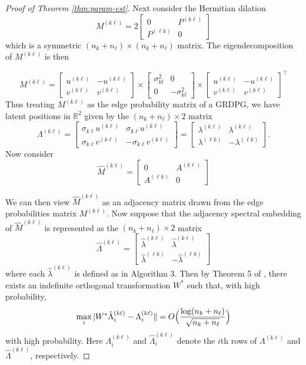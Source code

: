 \documentclass[
  12pt,
]{article}
\theoremstyle{definition}
\theoremstyle{definition}
\theoremstyle{definition}
\theoremstyle{definition}
\theoremstyle{remark}
\begin{document}
\begin{proof}[Proof of Theorem \ref{thm:param-est}]
Next consider the Hermitian dilation
\[
M^{(k \ell)} = 2 \begin{bmatrix} 0 & P^{(k \ell)} \\ P^{(\ell k)} & 0 \end{bmatrix}
\]
which is a symmetric \((n_k + n_\ell) \times (n_k + n_\ell)\) matrix. 
The eigendecomposition of \(M^{(k \ell)}\) is then

\[M^{(k \ell)} = 
\begin{bmatrix} u^{(k \ell)} & -u^{(k \ell)} \\ v^{(k \ell)} & v^{(k \ell)} \end{bmatrix} \times 
\begin{bmatrix} \sigma^2_{kl} & 0 \\ 0 & -\sigma^2_{kl} \end{bmatrix} \times
\begin{bmatrix} u^{(k \ell)} & -u^{(k \ell)} \\ v^{(k \ell)} & v^{(k \ell)} \end{bmatrix}^\top\]
Thus treating \(M^{(k \ell)}\) as the edge probability matrix of a GRDPG, we have latent positions in \(\mathbb{R}^2\) given by the $(n_k + n_{\ell}) \times 2$ matrix
\[\Lambda^{(k \ell)} = \begin{bmatrix} 
\sigma_{k \ell} u^{(k \ell)} & \sigma_{k \ell} u^{(k \ell)} \\ 
\sigma_{k \ell} v^{(k \ell)} & -\sigma_{k \ell} v^{(k \ell)} 
\end{bmatrix} = 
\begin{bmatrix} 
\lambda^{(k \ell)} & \lambda^{(k \ell)} \\ 
\lambda^{( \ell k)} & -\lambda^{( \ell k)} 
\end{bmatrix}.\]
Now consider
\[\hat{M}^{(k \ell)} = \begin{bmatrix} 0 & A^{(k \ell)} \\ A^{(\ell k)} & 0 \end{bmatrix}\]

We can then view \(\hat{M}^{(k \ell)}\) as an adjacency matrix drawn from
the edge probabilities matrix \(M^{(k \ell)}\). Now suppose that the adjacency spectral
embedding of $\hat{M}^{(k \ell)}$ is represented as the $(n_k +
n_{\ell}) \times 2$ matrix
\[\hat{\Lambda}^{(k \ell)} = \begin{bmatrix} 
\hat{\lambda}^{(k \ell)} & \hat{\lambda}^{(k \ell)} \\ 
\hat{\lambda}^{(\ell k)} & -\hat{\lambda}^{(\ell k)} 
\end{bmatrix}\]
where each \(\hat{\lambda}^{(k \ell)}\) is defined as in Algorithm 3. Then
by Theorem 5 of \citet{rubindelanchy2017statistical}, there
exists an indefinite orthogonal transformation $W^{*}$ such that,  with
high probability,
$$\max_{i} |W^{*} \hat{\Lambda}_{i}^{(k \ell)} - \Lambda_{i}^{(k \ell)} \| =
O\Bigl(\frac{\log (n_k + n_{\ell})}{\sqrt{n_k + n_{\ell}}}\Bigr)$$
with high probability. Here $\Lambda_{i}^{(k \ell)}$ and
$\hat{\Lambda}_i^{(k \ell)}$ denote the $i$th rows of $\Lambda^{(k
\ell)}$ and $\hat{\Lambda}^{(k \ell)}$, respectively. 


\end{proof}
\end{document}
